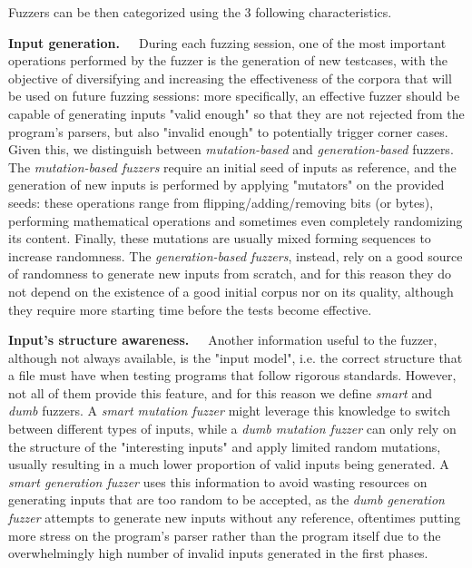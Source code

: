 \newpage
Fuzzers can be then categorized using the 3 following characteristics.

\textbf{Input generation.}\ \ \  During each fuzzing session, one of the most important operations performed by the fuzzer is the generation of new testcases, with the objective of diversifying and increasing the effectiveness of the corpora that will be used on future fuzzing sessions: more specifically, an effective fuzzer should be capable of generating inputs "valid enough" so that they are not rejected from the program's parsers, but also "invalid enough" to potentially trigger corner cases. Given this, we  distinguish between \textit{mutation-based} and \textit{generation-based} fuzzers. The \textit{mutation-based fuzzers} require an initial seed of inputs as reference, and the generation of new inputs is performed by applying "mutators" on the provided seeds: these operations range from flipping/adding/removing bits (or bytes), performing mathematical operations and sometimes even completely randomizing its content. Finally, these mutations are usually mixed forming sequences to increase randomness. The \textit{generation-based fuzzers}, instead, rely on a good source of randomness to generate new inputs from scratch, and for this reason they do not depend on the existence of a good initial corpus nor on its quality, although they require more starting time before the tests become effective.

\textbf{Input's structure awareness.}\ \ \ Another information useful to the fuzzer, although not always available, is the "input model", i.e. the correct structure that a file must have when testing programs that follow rigorous standards. However, not all of them provide this feature, and for this reason we define \textit{smart} and \textit{dumb} fuzzers.
A \textit{smart mutation fuzzer} might leverage this knowledge to switch between different types of inputs, while a \textit{dumb mutation fuzzer} can only rely on the structure of the "interesting inputs" and apply limited random mutations, usually resulting in a much lower proportion of valid inputs being generated.
A \textit{smart generation fuzzer} uses this information to avoid wasting resources on generating inputs that are too random to be accepted, as the \textit{dumb generation fuzzer} attempts to generate new inputs without any reference, oftentimes putting more stress on the program's parser rather than the program itself due to the overwhelmingly high number of invalid inputs generated in the first phases.

